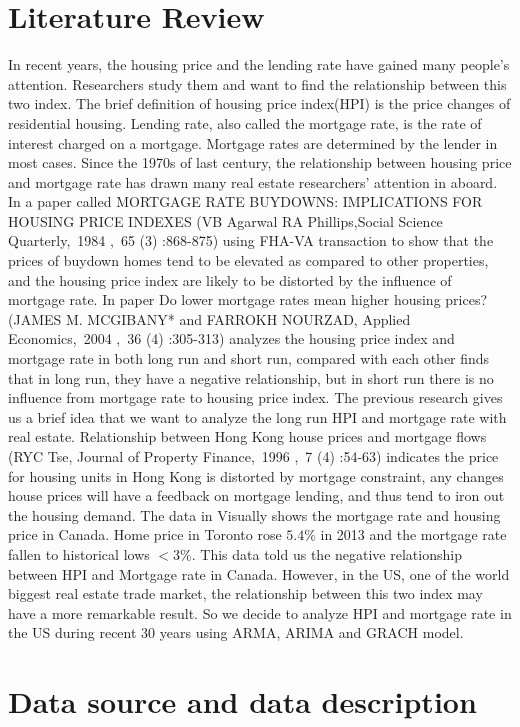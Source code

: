 \documentclass[12pt,letterpaper]{article}
\begin{document}
\section{Literature Review}
In recent years, the housing price and the lending rate have gained many people’s attention. Researchers study them and want to find the relationship between this two index.
The brief definition of housing price index(HPI) is the price changes of residential housing. 
Lending rate, also called the mortgage rate, is the rate of interest charged on a mortgage. Mortgage rates are determined by the lender in most cases.
Since the 1970s of last century, the relationship between housing price and mortgage rate has drawn many real estate researchers’ attention in aboard. In a paper called MORTGAGE RATE BUYDOWNS: IMPLICATIONS FOR HOUSING PRICE INDEXES (VB Agarwal RA Phillips,Social Science Quarterly, 1984 , 65 (3) :868-875) using FHA-VA transaction to show that the prices of buydown homes tend to be elevated as compared to other properties, and the housing price index are likely to be distorted by the influence of mortgage rate. 
In paper Do lower mortgage rates mean higher housing prices? (JAMES M. MCGIBANY* and FARROKH NOURZAD, Applied Economics, 2004 , 36 (4) :305-313) analyzes the housing price index and mortgage rate in both long run and short run, compared with each other finds that in long run, they have a negative relationship, but in short run there is no influence from mortgage rate to housing price index. 
The previous research gives us a brief idea that we want to analyze the long run HPI and mortgage rate with real estate.
Relationship between Hong Kong house prices and mortgage flows (RYC Tse, Journal of Property Finance, 1996 , 7 (4) :54-63)  indicates the price for housing units in Hong Kong is distorted by mortgage constraint, any changes house prices will have a feedback on mortgage lending, and thus tend to iron out the housing demand. 
The data in Visually shows the mortgage rate and housing price in Canada. Home price in Toronto rose $5.4\%$ in 2013 and the mortgage rate fallen to historical lows $<3\%$. This data told us the negative relationship between HPI and Mortgage rate in Canada.
However, in the US, one of the world biggest real estate trade market, the relationship between this two index may have a more remarkable result.
So we decide to analyze HPI and mortgage rate in the US during recent 30 years using ARMA, ARIMA and GRACH model.


\section{Data source and data description}
\end{document}
